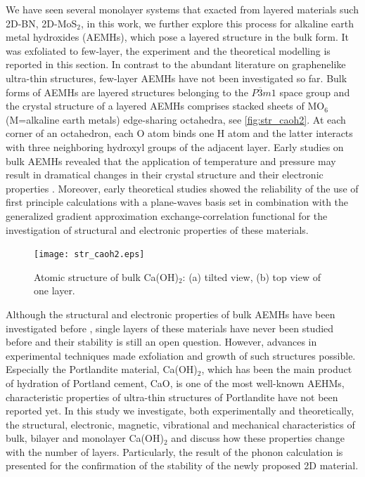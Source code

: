 We have seen several monolayer systems that exacted from layered materials such 2D-BN, 2D-MoS$_2$, in this work, we further explore this process for alkaline earth metal hydroxides (AEMHs), which pose a layered structure in the bulk form. It was exfoliated  to few-layer, the experiment and the theoretical modelling is reported in this section. In contrast to the abundant literature on graphenelike ultra-thin structures, few-layer AEMHs have not been investigated so far. Bulk forms of AEMHs are layered structures belonging to the $P\overline{3}m1$ space group\cite{structure1} and the crystal structure of a layered AEMHs comprises stacked sheets of MO$_6$ (M=alkaline earth metals) edge-sharing octahedra, see \autoref{fig:str_caoh2}. At each corner of an octahedron, each O atom binds one H atom and the latter interacts with three neighboring hydroxyl groups of the adjacent layer. Early studies on bulk AEMHs revealed that the application of temperature and pressure may result in dramatical changes in their crystal structure and their electronic properties\cite{amorphization1,amorphization2,amorphization3,amorphization4,transition1,transition2,transition3,transition4} . Moreover, early theoretical studies showed the reliability of the use of first principle calculations with a plane-waves basis set in combination with the generalized gradient approximation exchange-correlation functional for the investigation of structural and electronic properties of these materials\cite{Winkler1995,Baranek2001,Azuma2011,DArco1993}.

\begin{figure}
\centering
\texttt{[image: str\_caoh2.eps]}
\caption{\label{fig:str_caoh2} Atomic structure of bulk Ca(OH)$_2$: (a)
tilted view, (b) top view of one layer. }
\end{figure}

Although the structural and electronic properties of bulk AEMHs have been
investigated before \cite{Azuma2011,Pishtshev,Pishtshev1} , single layers of 
these materials have never been studied before and their stability is 
still an open question. However, advances 
in experimental techniques made exfoliation and growth of such 
structures possible\cite{new1,new2}. Especially the Portlandite material, Ca(OH)$_2$,
which has been the 
main product of hydration of Portland cement, CaO, is one of the most well-known 
AEHMs, characteristic properties of ultra-thin structures of Portlandite have 
not been reported yet. In this study we investigate, both experimentally and theoretically, 
the structural, electronic, magnetic, vibrational and mechanical 
characteristics of bulk, bilayer and monolayer Ca(OH)$_{2}$ and discuss how these properties change with the number of layers.  Particularly, the result of the phonon calculation is presented for the confirmation of the stability of the newly proposed 2D material.

